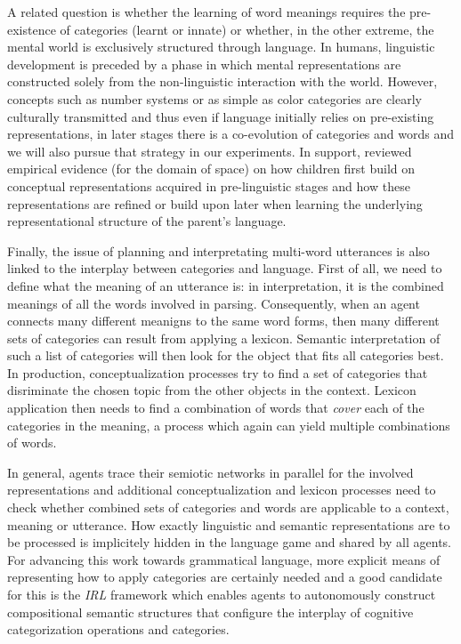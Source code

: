 A related question is whether the learning of word meanings requires
the pre-existence of categories (learnt or innate) or whether, in the
other extreme, the mental world is exclusively structured through
language. In humans, linguistic development is preceded by a phase in
which mental representations are constructed solely from the
non-linguistic interaction with the world. However, concepts such as
number systems or as simple as color categories are clearly culturally
transmitted and thus even if language initially relies on pre-existing
representations, in later stages there is a co-evolution of categories
and words and we will also pursue that strategy in our experiments.
In support, \cite{clark04how} reviewed empirical evidence (for the
domain of space) on how children first build on conceptual
representations acquired in pre-linguistic stages and how these
representations are refined or build upon later when learning the
underlying representational structure of the parent's language.


Finally, the issue of planning and interpretating multi-word
utterances is also linked to the interplay between categories and
language. First of all, we need to define what the meaning of an
utterance is: in interpretation, it is the combined meanings of all
the words involved in parsing. Consequently, when an agent connects
many different meanigns to the same word forms, then many different
sets of categories can result from applying a lexicon. Semantic
interpretation of such a list of categories will then look for the
object that fits all categories best. In production, conceptualization
processes try to find a set of categories that disriminate the chosen
topic from the other objects in the context. Lexicon application then
needs to find a combination of words that \emph{cover} each of the
categories in the meaning, a process which again can yield multiple
combinations of words.

In general, agents trace their semiotic networks in parallel for the
involved representations and additional conceptualization and lexicon
processes need to check whether combined sets of categories and words
are applicable to a context, meaning or utterance. How exactly
linguistic and semantic representations are to be processed is
implicitely hidden in the language game and shared by all agents. For
advancing this work towards grammatical language, more explicit means
of representing how to apply categories are certainly needed and a
good candidate for this is the \emph{IRL} framework
\cite*{steels05planning,vandenbroeck08constraint-based,spranger10open-ended-semantics,spranger10open-ended,spranger12openended}
which enables agents to autonomously construct compositional semantic
structures that configure the interplay of cognitive categorization
operations and categories.






